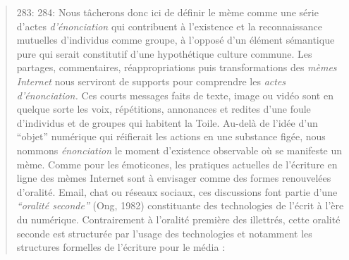 \begin{quote}
283: 
284: Nous t\^acherons donc ici de d\'efinir le m\`eme comme une s\'erie d{\textquoteright}actes \textit{d{\textquoteright}\'enonciation }qui contribuent \`a l{\textquoteright}existence et la reconnaissance mutuelles d{\textquoteright}individus comme groupe, \`a l{\textquoteright}oppos\'e d{\textquoteright}un \'el\'ement s\'emantique pure qui serait constitutif d{\textquoteright}une hypoth\'etique culture commune. Les partages, commentaires, r\'eappropriations puis transformations des \textit{m\`emes Internet }nous serviront de supports pour comprendre les \textit{actes d{\textquoteright}\'enonciation. }Ces courts messages faits de texte, image ou vid\'eo sont en quelque sorte les voix, r\'ep\'etitions, annonances et redites d{\textquoteright}une foule d{\textquoteright}individus et de groupes qui habitent la Toile. Au-del\`a de l{\textquoteright}id\'ee d{\textquoteright}un {\textquotedblleft}objet{\textquotedblright} num\'erique qui r\'eifierait les actions en une substance fig\'ee, nous nommons \textit{\'enonciation} le moment d{\textquoteright}existence observable o\`u se manifeste un m\`eme. Comme pour les \'emoticones, les pratiques actuelles de l{\textquoteright}\'ecriture en ligne des m\`emes Internet sont \`a envisager comme des formes renouvel\'ees d{\textquoteright}oralit\'e. Email, chat ou r\'eseaux sociaux, ces discussions font partie d{\textquoteright}une \textit{{\textquotedblleft}oralit\'e seconde{\textquotedblright} }(Ong, 1982) constituante des technologies de l{\textquoteright}\'ecrit \`a l{\textquoteright}\`ere du num\'erique. Contrairement \`a l{\textquoteright}oralit\'e premi\`ere des illettr\'es, cette oralit\'e seconde est structur\'ee par l{\textquoteright}usage des technologies et notamment les structures formelles de l{\textquoteright}\'ecriture pour le m\'edia :  

\end{quote}
